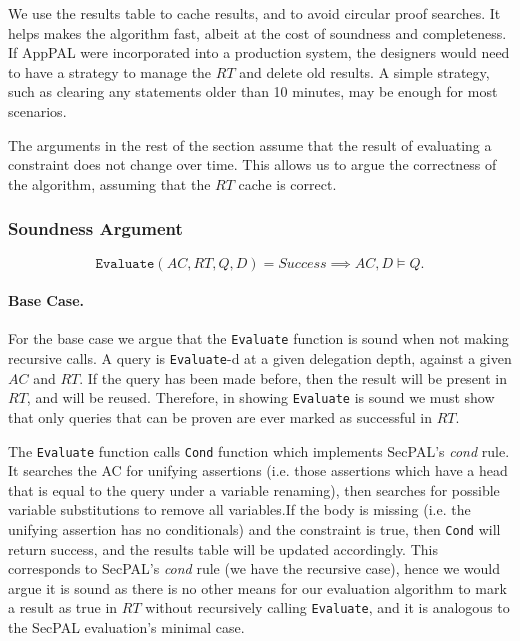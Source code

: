 \documentclass[thesis.tex]{subfiles}
\begin{document}
We use the results table to cache results, and to avoid circular proof searches.
It helps makes the algorithm fast, albeit at the cost of soundness and
completeness. If AppPAL were incorporated into a production system, the
designers would need to have a strategy to manage the $RT$ and delete old
results. A simple strategy, such as clearing any statements older than 10
minutes, may be enough for most scenarios.

The arguments in the rest of the section assume that the result of evaluating a
constraint does not change over time. This allows us to argue the
correctness of the algorithm, assuming that the $RT$ cache is correct.

\subsubsection*{Soundness Argument}

\begin{equation*}
  \mathtt{Evaluate}(AC, RT, Q, D) = \textit{Success} \implies
  AC, D \models Q.
\end{equation*}

\paragraph*{Base Case.}  For the base case we argue that the
\texttt{Evaluate} function is sound when not making recursive calls.
A query is \texttt{Evaluate}-d at a given delegation depth, against a
given $AC$ and $RT$. If the query has been made before, then the
result will be present in $RT$, and will be reused. Therefore, in
showing \texttt{Evaluate} is sound we must show that only queries that
can be proven are ever marked as successful in $RT$.

The \texttt{Evaluate} function calls \texttt{Cond} function which
implements SecPAL's \emph{cond} rule.  It searches the AC for unifying
assertions (i.e. those assertions which have a head that is equal to
the query under a variable renaming), then searches for possible
variable substitutions to remove all variables.If the body is missing
(i.e. the unifying assertion has no conditionals) and the constraint
is true, then \texttt{Cond} will return success, and the results table
will be updated accordingly.  This corresponds to SecPAL's \emph{cond}
rule (we have  the recursive case), hence we would
argue it is sound as there is no other means for our evaluation
algorithm to mark a result as true in $RT$ without recursively calling
\texttt{Evaluate}, and it is analogous to the SecPAL evaluation's
minimal case.
\end{document}
